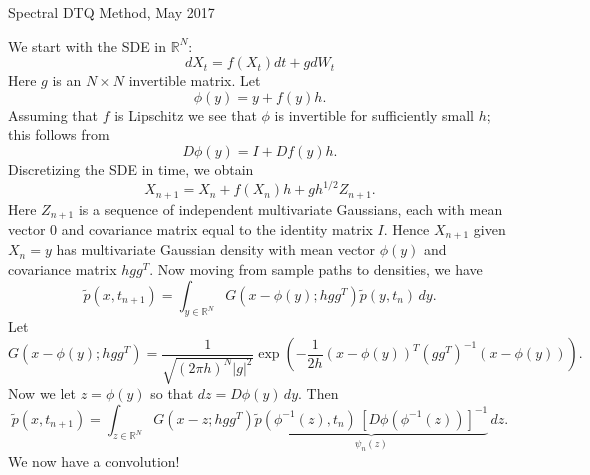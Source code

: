 \documentclass[12pt]{article}
\begin{document}
\begin{center}
Spectral DTQ Method, May 2017
\end{center}
We start with the SDE in $\mathbb{R}^N$:
$$
dX_t = f(X_t) dt + g dW_t
$$
Here $g$ is an $N \times N$ invertible matrix.
Let
$$
\phi(y) = y + f(y) h.
$$
Assuming that $f$ is Lipschitz we see that $\phi$ is invertible for sufficiently small $h$; this follows from
$$
D \phi(y) = I + Df(y) h.
$$
Discretizing the SDE in time, we obtain
$$
X_{n+1} = X_n + f(X_n) h + g h^{1/2} Z_{n+1}.
$$
Here $Z_{n+1}$ is a sequence of independent multivariate Gaussians, each
with mean vector $0$ and covariance matrix equal to the identity matrix $I$.
Hence $X_{n+1}$ given $X_n = y$ has multivariate Gaussian density with mean
vector $\phi(y)$ and covariance matrix $h g g^T$.
Now moving from sample paths to densities, we have
$$
\widetilde{p}(x,t_{n+1}) = \int_{y \in \mathbb{R}^N} G(x - \phi(y);h g g^T) \widetilde{p}(y,t_n) \, dy.
$$
Let
$$
G(x - \phi(y);h g g^T) = \frac{1}{\sqrt{ (2 \pi h)^N |g|^2 }} \exp \left( -\frac{1}{2h} (x - \phi(y))^T (g g^T)^{-1} (x - \phi(y)) \right).
$$
Now we let $z = \phi(y)$ so that $dz = D\phi(y) \, dy$.  Then
$$
\widetilde{p}(x,t_{n+1}) = \int_{z \in \mathbb{R}^N} G(x - z; h g g^T) \underbrace{\widetilde{p}(\phi^{-1}(z),t_n) \, [D\phi(\phi^{-1}(z))]^{-1}}_{\psi_n(z)} \, dz.
$$
We now have a convolution! 
\end{document}
